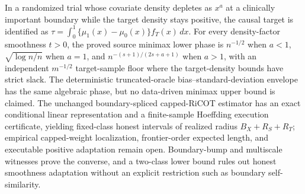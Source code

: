 In a randomized trial whose covariate density depletes as \(x^a\) at a clinically important boundary while the target density stays positive, the causal target is identified as \(\tau=\int_0^1\{\mu_1(x)-\mu_0(x)\}f_T(x)\,dx\). For every density-factor smoothness \(t>0\), the proved source minimax lower phase is \(n^{-1/2}\) when \(a<1\), \(\sqrt{\log n/n}\) when \(a=1\), and \(n^{-(s+1)/(2s+a+1)}\) when \(a>1\), with an independent \(m^{-1/2}\) target-sample floor where the target-density bounds have strict slack. The deterministic truncated-oracle bias--standard-deviation envelope has the same algebraic phase, but no data-driven minimax upper bound is claimed. The unchanged boundary-spliced capped-RiCOT estimator has an exact conditional linear representation and a finite-sample Hoeffding execution certificate, yielding fixed-class honest intervals of realized radius \(B_X+R_S+R_T\); empirical capped-weight localization, frontier-order expected length, and executable positive adaptation remain open. Boundary-bump and multiscale witnesses prove the converse, and a two-class lower bound rules out honest smoothness adaptation without an explicit restriction such as boundary self-similarity.